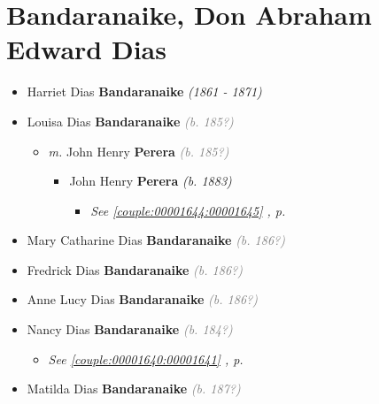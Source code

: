 \documentclass[10pt, openany]{book}
\begin{document}
\chapter{Bandaranaike, Don Abraham Edward Dias}
\label{00001639}
\textcolor{slmaroon}{\textit{}}
\begin{itemize}
\item{Harriet Dias \textbf{Bandaranaike} \textcolor{slorange}{\textit{(1861 - 1871)}}
  }
\item{Louisa Dias \textbf{Bandaranaike} \textcolor{gray}{\textit{(b. 185?)}}
\begin{itemize}
\item{\textit{m.} John Henry \textbf{Perera} \textcolor{gray}{\textit{(b. 185?)}}   \label{couple:00001642:00001643} \begin{itemize}
\item{John Henry \textbf{Perera} \textcolor{slorange}{\textit{(b. 1883)}}
\begin{itemize}
\item{\textcolor{slteal}{\textit{See  \autoref{couple:00001644:00001645} \textit{, p. \pageref{couple:00001644:00001645} }}}}
\end{itemize}
  }
\end{itemize}}
\end{itemize}
  }
\item{Mary Catharine Dias \textbf{Bandaranaike} \textcolor{gray}{\textit{(b. 186?)}}
   }
\item{Fredrick Dias \textbf{Bandaranaike} \textcolor{gray}{\textit{(b. 186?)}}
  }
\item{Anne Lucy Dias \textbf{Bandaranaike} \textcolor{gray}{\textit{(b. 186?)}}
   }
\item{Nancy Dias \textbf{Bandaranaike} \textcolor{gray}{\textit{(b. 184?)}}
\begin{itemize}
\item{\textcolor{slteal}{\textit{See  \autoref{couple:00001640:00001641} \textit{, p. \pageref{couple:00001640:00001641} }}}}
\end{itemize}
  }
\item{Matilda Dias \textbf{Bandaranaike} \textcolor{gray}{\textit{(b. 187?)}}
  }

\end{itemize}
\end{document}
